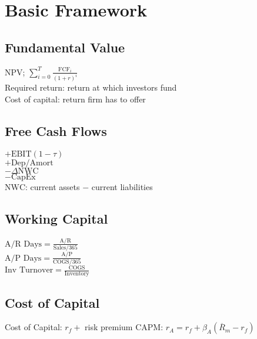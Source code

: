 \section{Basic Framework}
	\subsection*{Fundamental Value}
	NPV; $\sum_{i = 0}^{T}\frac{\text{FCF}_{i}}{\left(1 + r\right)^{i}}$\\
	Required return: return at which investors fund\\
	Cost of capital: return firm has to offer
	
	\subsection*{Free Cash Flows}
	$+\text{EBIT}\left(1 - \tau\right)$\\
	$+\text{Dep/Amort}$\\
	$-\Delta\text{NWC}$\\
	$-\text{CapEx}$\\
	$\text{NWC}$: current assets $-$ current liabilities
	
	\subsection*{Working Capital}
	$\text{A/R Days} = \frac{\text{A/R}}{\text{Sales}/365}$\\
	$\text{A/P Days} = \frac{\text{A/P}}{\text{COGS}/365}$\\
	$\text{Inv Turnover} = \frac{\text{COGS}}{\text{Inventory}}$
	
	\subsection*{Cost of Capital}
	Cost of Capital: $r_{f} + $ risk premium
	CAPM: $r_{A} = r_{f} + \beta_{A}\left(\overline{R}_{m} - r_{f}\right)$
	